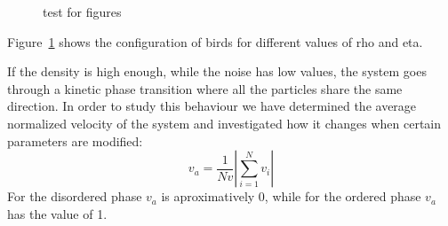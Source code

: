 \documentclass[twoside,twocolumn]{article}
\begin{document}
\begin{figure}[!htb]
	\caption{test for figures}
  \label{fig:configs}
\end{figure}

Figure~\ref{fig:configs} shows the configuration of birds for different values of rho and eta.

If the density is high enough, while the noise has low values, the system goes through a kinetic phase transition where all the particles share the same direction. In order to study this behaviour we have determined the average normalized velocity of the system and investigated how it changes when certain parameters are modified:
\begin{equation}
v_a=\frac{1}{Nv}\left\vert\sum_{i=1}^{N} v_i\right\vert
\end{equation}
For the disordered phase $v_a$ is aproximatively 0, while for the ordered phase $v_a$ has the value of 1.
\end{document}
